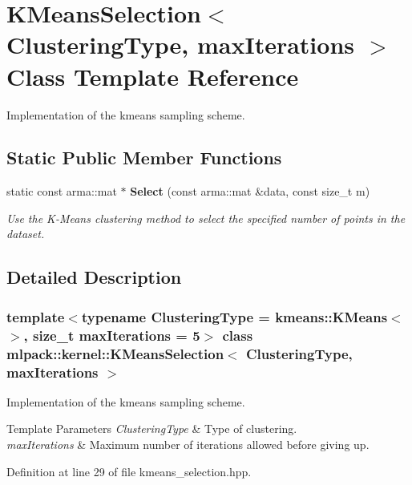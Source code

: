 \section{K\+Means\+Selection$<$ Clustering\+Type, max\+Iterations $>$ Class Template Reference}
\label{classmlpack_1_1kernel_1_1KMeansSelection}


Implementation of the kmeans sampling scheme.  


\subsection*{Static Public Member Functions}
\begin{DoxyCompactItemize}
\item 
static const arma\+::mat $\ast$ \textbf{ Select} (const arma\+::mat \&data, const size\+\_\+t m)
\begin{DoxyCompactList}\small\item\em Use the K-\/\+Means clustering method to select the specified number of points in the dataset. \end{DoxyCompactList}\end{DoxyCompactItemize}


\subsection{Detailed Description}
\subsubsection*{template$<$typename Clustering\+Type = kmeans\+::\+K\+Means$<$$>$, size\+\_\+t max\+Iterations = 5$>$\newline
class mlpack\+::kernel\+::\+K\+Means\+Selection$<$ Clustering\+Type, max\+Iterations $>$}

Implementation of the kmeans sampling scheme. 


\begin{DoxyTemplParams}{Template Parameters}
{\em Clustering\+Type} & Type of clustering. \\
\hline
{\em max\+Iterations} & Maximum number of iterations allowed before giving up. \\
\hline
\end{DoxyTemplParams}


Definition at line 29 of file kmeans\+\_\+selection.\+hpp.



